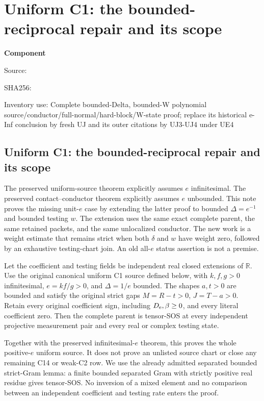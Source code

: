 \chapter{Uniform C1: the bounded-reciprocal repair and its scope}
\label{component:p41b39e2f94e1}
\noindent\textbf{Component }\par
{\small\noindent Source: \par}
{\small\noindent SHA256: \par}
{\small\noindent Inventory use: Complete bounded-Delta, bounded-W polynomial source/conductor/full-normal/hard-block/W-state proof; replace its historical e-Inf conclusion by fresh UJ and its outer citations by UJ3-UJ4 under UE4\par}
\medskip
\section{Uniform C1: the bounded-reciprocal repair and its scope}

The preserved uniform-source theorem explicitly assumes $e$ infinitesimal.
The preserved contact--conductor theorem explicitly assumes $e$ unbounded.
This note proves the missing unit-$e$ case by extending the latter proof
to bounded $\Delta=e^{-1}$ and bounded testing $w$. The extension uses
the same exact complete parent, the same retained packets, and the same
unlocalized conductor. The new work is a weight estimate that remains
strict when both $\delta$ and $w$ have weight zero, followed by an
exhaustive testing-chart join. An old all-$e$ status assertion is not a
premise.

\begin{theorem}
\label{p41b39e2f94e1:thm:bounded-delta}
Let the coefficient and testing fields be independent real closed
extensions of $\mathbb R$. Use the original canonical uniform C1 source
defined below, with $k,f,g>0$ infinitesimal, $e=kf/g>0$, and
$\Delta=1/e$ bounded. The shapes $a,t>0$ are bounded and satisfy the
original strict gaps $M=R-t>0$, $J=T-a>0$. Retain every original
coefficient sign, including $D_{\rm e},\beta\geq0$, and every literal
coefficient zero. Then the complete parent is tensor-SOS at every
independent projective measurement pair and every real or complex
testing state.
\end{theorem}

Together with the preserved infinitesimal-$e$ theorem, this proves the
whole positive-$e$ uniform source. It does not prove an unlisted source
chart or close any remaining C14 or weak-C2 row. We use the already
admitted separated bounded strict-Gram lemma: a finite bounded separated
Gram with strictly positive real residue gives tensor-SOS. No inversion
of a mixed element and no comparison between an independent coefficient
and testing rate enters the proof.

